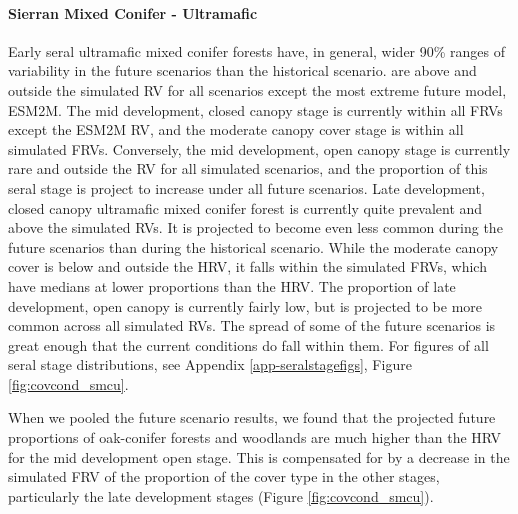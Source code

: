 \paragraph{Sierran Mixed Conifer - Ultramafic} Early seral ultramafic mixed conifer forests have, in general, wider 90\% ranges of variability in the future scenarios than the historical scenario. are above and outside the simulated RV for all scenarios except the most extreme future model, ESM2M. The mid development, closed canopy stage is currently within all FRVs except the ESM2M RV, and the moderate canopy cover stage is within all simulated FRVs. Conversely, the mid development, open canopy stage is currently rare and outside the RV for all simulated scenarios, and the proportion of this seral stage is project to increase under all future scenarios. Late development, closed canopy ultramafic mixed conifer forest is currently quite prevalent and above the simulated RVs. It is projected to become even less common during the future scenarios than during the historical scenario. While the moderate canopy cover is below and outside the HRV, it falls within the simulated FRVs, which have medians at lower proportions than the HRV. The proportion of late development, open canopy is currently fairly low, but is projected to be more common across all simulated RVs. The spread of some of the future scenarios is great enough that the current conditions do fall within them. For figures of all seral stage distributions, see Appendix \ref{app-seralstagefigs}, Figure \ref{fig:covcond_smcu}.

When we pooled the future scenario results, we found that the projected future proportions of oak-conifer forests and woodlands are much higher than the HRV for the mid development open stage. This is compensated for by a decrease in the simulated FRV of the proportion of the cover type in the other stages, particularly the late development stages (Figure \ref{fig:covcond_smcu}).

